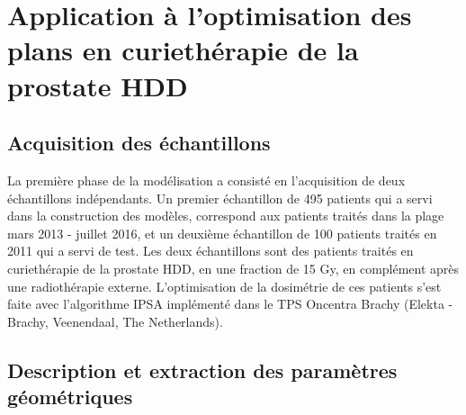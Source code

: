 \section{Application à l'optimisation des plans en curiethérapie de la prostate HDD}
\subsection{Acquisition des échantillons}
La première phase de la modélisation a consisté en l’acquisition de deux échantillons indépendants. Un premier échantillon de 495 patients qui a servi dans la construction des modèles, correspond aux patients traités dans la plage mars 2013 - juillet 2016, et un deuxième échantillon de 100 patients traités en 2011 qui a servi de test. Les deux échantillons sont des patients traités en curiethérapie de la prostate HDD, en une fraction de 15 Gy, en complément après une radiothérapie externe. L'optimisation de la dosimétrie de ces patients s'est faite avec l'algorithme IPSA implémenté dans le TPS Oncentra Brachy (Elekta - Brachy, Veenendaal, The Netherlands).
%
\subsection{Description et extraction des paramètres géométriques} \label{Parag}
